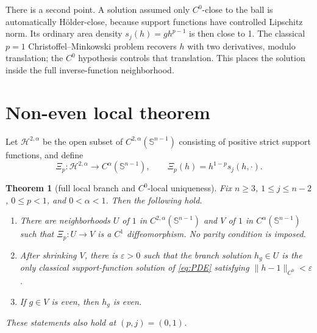 \documentclass[11pt]{article}
\newtheorem{theorem}{Theorem}
\newcommand{\Sn}{\mathbb S^{n-1}}
\newcommand{\cH}{\mathcal H}
\begin{document}
There is a second point.  A solution assumed only $C^0$-close to the ball is
automatically H\"older-close, because support functions have controlled
Lipschitz norm.  Its ordinary area density $s_j(h)=gh^{p-1}$ is then close
to 1.  The classical $p=1$ Christoffel--Minkowski problem recovers $h$ with
two derivatives, modulo translation; the $C^0$ hypothesis controls that
translation.  This places the solution inside the full inverse-function
neighborhood.

\section{Non-even local theorem}

Let $\cH^{2,\alpha}$ be the open subset of $C^{2,\alpha}(\Sn)$ consisting
of positive strict support functions, and define
\[
  \Xi_p:\cH^{2,\alpha}\longrightarrow C^\alpha(\Sn),
  \qquad \Xi_p(h)=h^{1-p}s_j(h,\cdot).
\]

\begin{theorem}[full local branch and $C^0$-local uniqueness]\label{thm:main}
Fix $n\ge3$, $1\le j\le n-2$, $0\le p<1$, and $0<\alpha<1$.
Then the following hold.
\begin{enumerate}
\item There are neighborhoods $U$ of $1$ in $C^{2,\alpha}(\Sn)$ and
  $V$ of $1$ in $C^\alpha(\Sn)$ such that
  $\Xi_p:U\to V$ is a $C^1$ diffeomorphism.  No parity condition is imposed.
\item After shrinking $V$, there is $\varepsilon>0$ such that the branch
  solution $h_g\in U$ is the only classical support-function solution of
  \eqref{eq:PDE} satisfying $\|h-1\|_{C^0}<\varepsilon$.
\item If $g\in V$ is even, then $h_g$ is even.
\end{enumerate}
These statements also hold at $(p,j)=(0,1)$.
\end{theorem}
\end{document}
